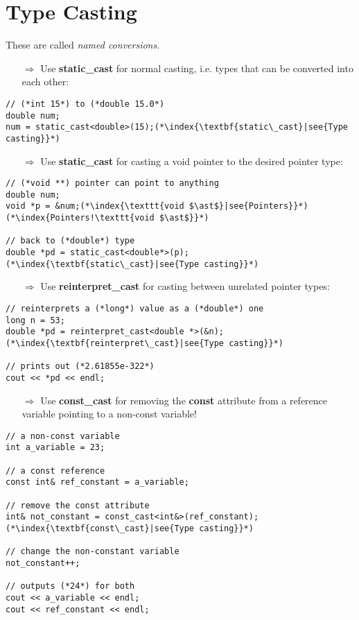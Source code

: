 \documentclass[10pt]{book}
\begin{document}
\section{Type Casting}
These are called \emph{named conversions}.
\begin{enumerate}
\item[$\Rightarrow$] Use \textbf{static\_cast} for normal casting, i.e. types that can be converted into each other:
\end{enumerate}
\begin{lstlisting}
// (*int 15*) to (*double 15.0*)
double num;
num = static_cast<double>(15);(*\index{\textbf{static\_cast}|see{Type casting}}*)
\end{lstlisting}
\begin{enumerate}
\item[$\Rightarrow$] Use \textbf{static\_cast} for casting a void pointer to the desired pointer type:
\end{enumerate}
\begin{lstlisting}
// (*void **) pointer can point to anything
double num;
void *p = &num;(*\index{\texttt{void $\ast$}|see{Pointers}}*)(*\index{Pointers!\texttt{void $\ast$}}*) 

// back to (*double*) type
double *pd = static_cast<double*>(p);(*\index{\textbf{static\_cast}|see{Type casting}}*)
\end{lstlisting}
\begin{enumerate}
\item[$\Rightarrow$] Use \textbf{reinterpret\_cast} for casting between unrelated pointer types:
\end{enumerate}
\begin{lstlisting}
// reinterprets a (*long*) value as a (*double*) one
long n = 53;
double *pd = reinterpret_cast<double *>(&n);(*\index{\textbf{reinterpret\_cast}|see{Type casting}}*)

// prints out (*2.61855e-322*)
cout << *pd << endl;
\end{lstlisting}
\begin{enumerate}
\item[$\Rightarrow$] Use \textbf{const\_cast} for removing the \textbf{const} attribute from a reference variable pointing to a non-const variable!
\end{enumerate}
\begin{lstlisting}
// a non-const variable
int a_variable = 23;

// a const reference
const int& ref_constant = a_variable;

// remove the const attribute
int& not_constant = const_cast<int&>(ref_constant);(*\index{\textbf{const\_cast}|see{Type casting}}*)

// change the non-constant variable
not_constant++;

// outputs (*24*) for both
cout << a_variable << endl;
cout << ref_constant << endl;
\end{lstlisting}
\end{document}
